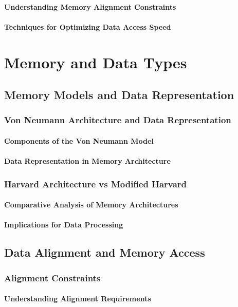 \documentclass[12pt, oneside]{book}
\begin{document}
\subsubsection{Understanding Memory Alignment Constraints}
\subsubsection{Techniques for Optimizing Data Access Speed}

\chapter{Memory and Data Types}
\section{Memory Models and Data Representation}
\subsection{Von Neumann Architecture and Data Representation}
\subsubsection{Components of the Von Neumann Model}
\subsubsection{Data Representation in Memory Architecture}
\subsection{Harvard Architecture vs Modified Harvard}
\subsubsection{Comparative Analysis of Memory Architectures}
\subsubsection{Implications for Data Processing}
\section{Data Alignment and Memory Access}
\subsection{Alignment Constraints}
\subsubsection{Understanding Alignment Requirements}
\end{document}
